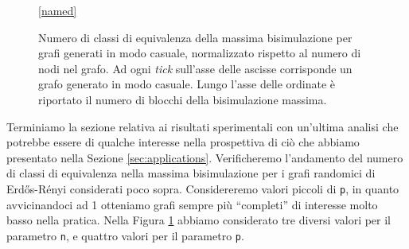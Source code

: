 \begin{figure}[b!]
\begin{center}
\begin{subfigure}[b]{0.3\textwidth}
\begin{tikzpicture}[scale=1.3]
            \end{tikzpicture}
        \end{subfigure}
        \begin{subfigure}[b]{0.3\textwidth}
        \end{subfigure}
        \ref*{named}
    \end{center}
    \caption{Numero di classi di equivalenza della massima bisimulazione per grafi generati in modo casuale, normalizzato rispetto al numero di nodi nel grafo. Ad ogni \emph{tick} sull'asse delle ascisse corrisponde un grafo generato in modo casuale. Lungo l'asse delle ordinate è riportato il numero di blocchi della bisimulazione massima.}
    \label{fig:bisi_size}
\end{figure}

Terminiamo la sezione relativa ai risultati sperimentali con un'ultima analisi che potrebbe essere di qualche interesse nella prospettiva di ciò che abbiamo presentato nella Sezione \ref{sec:applications}. Verificheremo l'andamento del numero di classi di equivalenza nella massima bisimulazione per i grafi randomici di Erdős-Rényi considerati poco sopra. Considereremo valori piccoli di \verb|p|, in quanto avvicinandoci ad 1 otteniamo grafi sempre più ``completi'' di interesse molto basso nella pratica. Nella Figura \ref{fig:bisi_size} abbiamo considerato tre diversi valori per il parametro \verb|n|, e quattro valori per il parametro \verb|p|.

